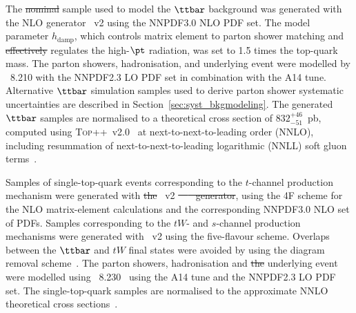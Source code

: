 \documentclass[PAPER, coverpage, atlasdraft=true, texlive=2016, UKenglish]{\ATLASLATEXPATH atlasdoc}
\providecommand{\DIFadd}[1]{{\protect\color{blue}\uwave{#1}}} %
\providecommand{\DIFdel}[1]{{\protect\color{red}\sout{#1}}}                      %
\providecommand{\DIFaddbegin}{} %
\providecommand{\DIFaddend}{} %
\providecommand{\DIFdelbegin}{} %
\providecommand{\DIFdelend}{} %
\begin{document}
The \DIFdelbegin \DIFdel{nominal }\DIFdelend sample used to model the $\ttbar$ background was generated with the NLO generator {\powheg}~v2
using the NNPDF3.0 NLO PDF set. The {\powheg} model parameter $h_{\textrm{damp}}$, which controls 
matrix element to parton shower matching and \DIFdelbegin \DIFdel{effectively }\DIFdelend regulates the high-$\pt$ radiation, was set to 1.5 times the top-quark mass. 
The parton showers, hadronisation, and underlying event were modelled by {\pythia}~8.210 with the NNPDF2.3 LO PDF set in combination with the A14 tune.
Alternative $\ttbar$ simulation samples used to derive parton shower systematic uncertainties are described in Section~\ref{sec:syst_bkgmodeling}. 
The generated $\ttbar$ samples are normalised to a theoretical cross section of $832^{+46}_{-51}$~pb, 
computed using \textsc{Top++}~v2.0~\cite{Czakon:2011xx} at next-to-next-to-leading order (NNLO), 
including resummation of next-to-next-to-leading logarithmic (NNLL) soft gluon 
terms~\cite{Cacciari:2011hy,Baernreuther:2012ws,Czakon:2012zr,Czakon:2012pz,Czakon:2013goa}.

Samples of single-top-quark events corresponding to the $t$-channel production mechanism were generated with \DIFdelbegin \DIFdel{the 
}\DIFdelend \DIFaddbegin \DIFadd{a  
}\DIFaddend {\powheg}~v2 \DIFdelbegin \DIFdel{~\mbox{%
\cite{Frederix:2012dh} }\hspace{0pt}%
generator}\DIFdelend \DIFaddbegin \DIFadd{generator~\mbox{%
\cite{Frederix:2012dh}}\hspace{0pt}%
}\DIFaddend , using the 4F scheme  for the NLO matrix-element calculations
and the corresponding NNPDF3.0 NLO set of PDFs.
Samples corresponding to the $tW$- and $s$-channel production mechanisms were generated 
with {\powheg}~v2 using the five-flavour scheme. Overlaps between the $\ttbar$ and $tW$ final states were avoided by using 
the diagram removal scheme~\cite{Frixione:2005vw}.
The parton showers, hadronisation and \DIFdelbegin \DIFdel{the }\DIFdelend underlying event were modelled using {\pythia}~8.230~\cite{Sjostrand:2006za} using the A14 tune and the NNPDF2.3 LO PDF set.
The single-top-quark samples are normalised to the approximate NNLO theoretical cross 
sections~\cite{Kidonakis:2011wy,Kidonakis:2010ux,Kidonakis:2010tc}. 
\end{document}

